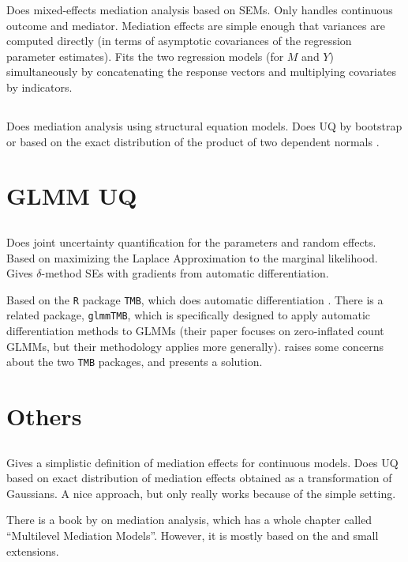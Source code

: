 \documentclass{article}
\begin{document}
Does mixed-effects mediation analysis based on SEMs. Only handles continuous outcome and mediator. Mediation effects are simple enough that variances are computed directly (in terms of asymptotic covariances of the regression parameter estimates). Fits the two regression models (for $M$ and $Y$) simultaneously by concatenating the response vectors and multiplying covariates by indicators.

\subsection{\citet{Pre10}}

Does mediation analysis using structural equation models. Does UQ by bootstrap or based on the exact distribution of the product of two dependent normals \citep{Mac07}.

\section{GLMM UQ}
\label{sec:GLMM_UQ}

\subsection{\citet{Zhe21}}

Does joint uncertainty quantification for the parameters and random effects. Based on maximizing the Laplace Approximation to the marginal likelihood. Gives $\delta$-method SEs with gradients from automatic differentiation.

Based on the \texttt{R} package \texttt{TMB}, which does automatic differentiation \citep{Kri16}. There is a related package, \texttt{glmmTMB}, which is specifically designed to apply automatic differentiation methods to GLMMs \citep{Bro17} (their paper focuses on zero-inflated count GLMMs, but their methodology applies more generally). \citet{Zhe21} raises some concerns about the two \texttt{TMB} packages, and presents a solution.

\section{Others}

\subsection{\citet{Ken03}}

Gives a simplistic definition of mediation effects for continuous models. Does UQ based on exact distribution of mediation effects obtained as a transformation of Gaussians. A nice approach, but only really works because of the simple setting.

There is a book by \citet{Mac17} on mediation analysis, which has a whole chapter called ``Multilevel Mediation Models''. However, it is mostly based on the \citet{Ken03} and small extensions. 




\end{document}

